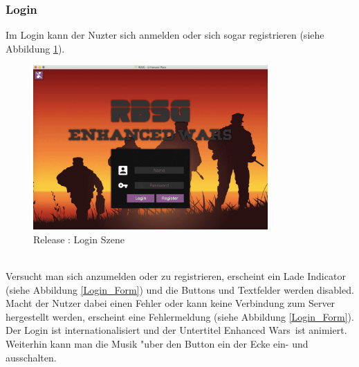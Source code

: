 \documentclass[12pt, titlepage]{scrartcl}
\newcommand{\RN}[1]{%
	\textup{\uppercase\expandafter{\romannumeral#1}}%
}
\begin{document}
            \subsubsection{Login}
                Im Login kann der Nuzter sich anmelden oder sich sogar registrieren (siehe Abbildung \ref{Login}). \\
                \begin{figure}[H] 
    				\centering
    				\includegraphics[width=0.8\textwidth]{images/old_state/login/Login.png}
    				\caption{Release \RN{2}: Login Szene}
    				\label{Login}
			    \end{figure}
			    \ \\ Versucht man sich anzumelden oder zu registrieren, erscheint ein Lade Indicator (siehe Abbildung \ref{Login_Form}) und die Buttons und Textfelder werden disabled. Macht der Nutzer dabei einen Fehler oder kann keine Verbindung zum Server hergestellt werden, erscheint eine Fehlermeldung (siehe Abbildung \ref{Login_Form}). Der Login ist internationalisiert und der Untertitel \glqq Enhanced Wars\grqq\ ist animiert. Weiterhin kann man die Musik "uber den Button ein der Ecke ein- und ausschalten. \\
\end{document}
